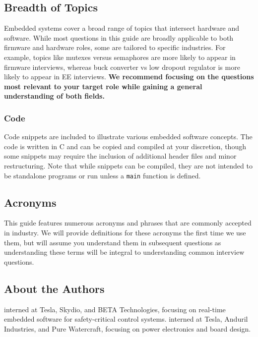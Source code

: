 \documentclass[main.tex]{subfiles}
\begin{document}
\subsection {Breadth of Topics}
Embedded systems cover a broad range of topics that intersect hardware and software. While most questions in this guide are broadly applicable to both firmware and hardware roles, some are tailored to specific industries. For example, topics like mutexes versus semaphores are more likely to appear in firmware interviews, whereas buck converter vs low dropout regulator is more likely to appear in EE interviews. \textbf{We recommend focusing on the questions most relevant to your target role while gaining a general understanding of both fields.}

\subsubsection{Code}
Code snippets are included to illustrate various embedded software concepts. The code is written in C and can be copied and compiled at your discretion, though some snippets may require the inclusion of additional header files and minor restructuring. Note that while snippets can be compiled, they are not intended to be standalone programs or run unless a \texttt{main} function is defined.

\subsection{Acronyms}
This guide features numerous acronyms and phrases that are commonly accepted in industry. We will provide definitions for these acronyms the first time we use them, but will assume you understand them in subsequent questions as understanding these terms will be integral to understanding common interview questions. 

\subsection{About the Authors}
 interned at Tesla, Skydio, and BETA Technologies, focusing on real-time embedded software for safety-critical control systems.
\newline
\newline
{} interned at Tesla, Anduril Industries, and Pure Watercraft, focusing on power electronics and board design. \newline
\end{document}

